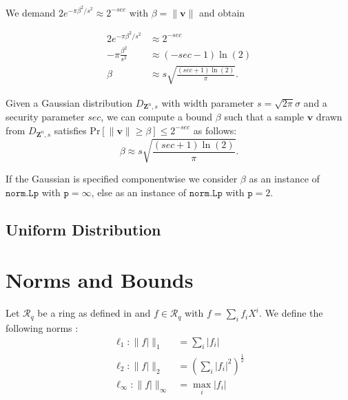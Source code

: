 \documentclass[
  a4paper,  %
  twoside,  %
  bibliography=totoc,
  headsepline,
  cleardoublepage=empty,
  parskip=half,
  draft=false
]{scrbook}
\begin{document}
We demand $2 e^{-\pi \beta^2/s^2} \approx 2^{-sec}$ with $\beta = \|\mathbf{v}\|$  and obtain

\begin{align*}
  2 e^{-\pi \beta^2/s^2}   & \approx 2^{-sec}                               \\
  -\pi \frac{\beta^2}{s^2} & \approx (-sec - 1)\ln (2)                      \\
  \beta                    & \approx s \sqrt{\frac{(sec + 1) \ln(2)}{\pi}}.
\end{align*}

\begin{theorem}
  Given a Gaussian distribution $D_{\mathbf{Z}^n, s}$ with width parameter $s  = \sqrt{2 \pi} \sigma$ and a security parameter $sec$, we can compute a bound $\beta$ such that a sample $\mathbf{v}$ drawn from $D_{\mathbf{Z}^n, s}$ satisfies $\text{Pr}\left[ \|\mathbf{v}\| \geq \beta \right] \leq 2^{-sec}$ as follows:
  \begin{equation}
    \beta  \approx s \sqrt{\frac{(sec + 1) \ln(2)}{\pi}}.
  \end{equation}
\end{theorem}

If the Gaussian is specified componentwise we consider $\beta$ as an instance of $\texttt{norm.Lp}$ with $\texttt{p} = \infty$, else as an instance of $\texttt{norm.Lp}$ with $\texttt{p} = 2$.


\subsection{Uniform Distribution}



\section{Norms and Bounds} %
Let $\mathcal{R}_q$ be a ring as defined in \cite{BDLOP18} and $f \in \mathcal{R}_q$ with $f = \sum_i f_i X^i$. We define the following norms \cite{BDLOP18}:
\begin{align}
  \ell_1 : \| f| \|_1           & = \sum_i |f_i|                               \\
  \ell_2 : \| f| \|_2           & = \left(\sum_i |f_i|^2\right) ^{\frac{1}{2}} \\
  \ell_\infty : \| f| \|_\infty & = \max_i |f_i|
\end{align}
\end{document}
